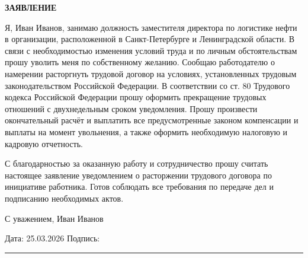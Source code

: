 \documentclass[12pt]{article}
\begin{document}
\begin{center}
\textbf{\LARGE ЗАЯВЛЕНИЕ}
\end{center}

\vspace{1cm}



Я, Иван Иванов, занимаю должность заместителя директора по логистике нефти в организации, расположенной в Санкт-Петербурге и Ленинградской области. В связи с необходимостью изменения условий труда и по личным обстоятельствам прошу уволить меня по собственному желанию. Сообщаю работодателю о намерении расторгнуть трудовой договор на условиях, установленных трудовым законодательством Российской Федерации. В соответствии со ст. 80 Трудового кодекса Российской Федерации прошу оформить прекращение трудовых отношений с двухнедельным сроком уведомления. Прошу произвести окончательный расчёт и выплатить все предусмотренные законом компенсации и выплаты на момент увольнения, а также оформить необходимую налоговую и кадровую отчетность.

С благодарностью за оказанную работу и сотрудничество прошу считать настоящее заявление уведомлением о расторжении трудового договора по инициативе работника. Готов соблюдать все требования по передаче дел и подписанию необходимых актов.

С уважением,
Иван Иванов



\vfill

Дата: 25.03.2026 \hfill Подпись: \rule{5cm}{0.4pt}
\end{document}
